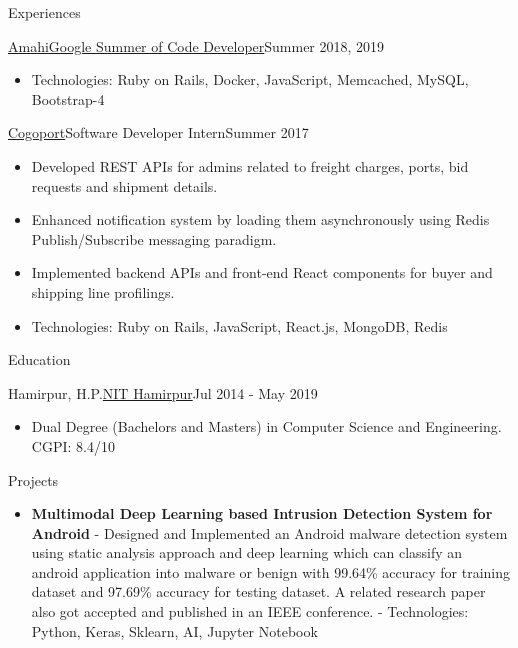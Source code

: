 \documentclass[]{mcdowellcv}
\begin{document}
\begin{cvsection}{Experiences}
\begin{cvsubsection}{\href {https://www.amahi.org/}{Amahi}}{\href {https://summerofcode.withgoogle.com/}{Google Summer of Code Developer}}{Summer 2018, 2019}
\begin{itemize}
				\item Technologies: Ruby on Rails, Docker, JavaScript, Memcached, MySQL, Bootstrap-4
			\end{itemize}
		\end{cvsubsection}
		\begin{cvsubsection}{\href {http://www.cogoport.com/}{Cogoport}}{Software Developer Intern}{Summer 2017}			
			\begin{itemize}
				\item Developed REST APIs for admins related to freight charges, ports, bid requests and shipment details.
				\item Enhanced notification system by loading them asynchronously using Redis Publish/Subscribe messaging paradigm.
				\item Implemented backend APIs and front-end React components for buyer and shipping line profilings.
				\item Technologies: Ruby on Rails, JavaScript, React.js, MongoDB, Redis
			\end{itemize}
		\end{cvsubsection}
	\end{cvsection}
	
	\begin{cvsection}{Education}
		\begin{cvsubsection}{Hamirpur, H.P.}{\href {http://nith.ac.in/}{NIT Hamirpur}}{Jul 2014 - May 2019}
			\begin{itemize}
				\item Dual Degree (Bachelors and Masters) in Computer Science and Engineering. CGPI: 8.4/10
			\end{itemize}
		\end{cvsubsection}
	\end{cvsection}
	
	\begin{cvsection}{Projects}
		\begin{cvsubsection}{}{}{}
			\begin{itemize}
				\item \textbf{Multimodal Deep Learning based Intrusion Detection System for Android}
				\newline- Designed and Implemented an Android malware detection system using static analysis approach and deep learning which can classify an android application into malware or benign with 99.64\% accuracy for training dataset and 97.69\% accuracy for testing dataset. A related research paper also got accepted and published in an IEEE conference.
				\newline- Technologies: Python, Keras, Sklearn, AI, Jupyter Notebook
			\end{itemize}
		\end{cvsubsection}
	\end{cvsection}
\end{document}
